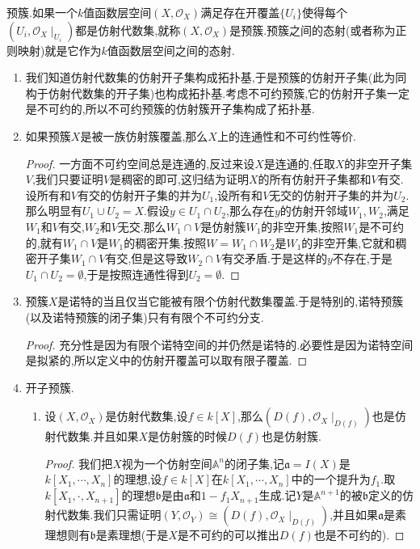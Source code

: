 预簇.如果一个$k$值函数层空间$(X,\mathscr{O}_X)$满足存在开覆盖$\{U_i\}$使得每个$(U_i,\mathscr{O}_X\mid_{U_i})$都是仿射代数集,就称$(X,\mathscr{O}_X)$是预簇.预簇之间的态射(或者称为正则映射)就是它作为$k$值函数层空间之间的态射.
\begin{enumerate}
	\item 我们知道仿射代数集的仿射开子集构成拓扑基,于是预簇的仿射开子集(此为同构于仿射代数集的开子集)也构成拓扑基.考虑不可约预簇,它的仿射开子集一定是不可约的,所以不可约预簇的仿射簇开子集构成了拓扑基.
	\item 如果预簇$X$是被一族仿射簇覆盖,那么$X$上的连通性和不可约性等价.
	\begin{proof}
		
		一方面不可约空间总是连通的,反过来设$X$是连通的,任取$X$的非空开子集$V$,我们只要证明$V$是稠密的即可,这归结为证明$X$的所有仿射开子集都和$V$有交.设所有和$V$有交的仿射开子集的并为$U_1$,设所有和$V$无交的仿射开子集的并为$U_2$.那么明显有$U_1\cup U_2=X$.假设$y\in U_1\cap U_2$,那么存在$y$的仿射开邻域$W_1,W_2$,满足$W_1$和$V$有交,$W_2$和$V$无交.那么$W_1\cap V$是仿射簇$W_1$的非空开集,按照$W_1$是不可约的,就有$W_1\cap V$是$W_1$的稠密开集.按照$W=W_1\cap W_2$是$W_1$的非空开集,它就和稠密开子集$W_1\cap V$有交,但是这导致$W_2\cap V$有交矛盾.于是这样的$y$不存在,于是$U_1\cap U_2=\emptyset$,于是按照连通性得到$U_2=\emptyset$.
	\end{proof}
    \item 预簇$X$是诺特的当且仅当它能被有限个仿射代数集覆盖.于是特别的,诺特预簇(以及诺特预簇的闭子集)只有有限个不可约分支.
    \begin{proof}
    	
    	充分性是因为有限个诺特空间的并仍然是诺特的.必要性是因为诺特空间是拟紧的,所以定义中的仿射开覆盖可以取有限子覆盖.
    \end{proof}
    \item 开子预簇.
    \begin{enumerate}
    	\item 设$(X,\mathscr{O}_X)$是仿射代数集,设$f\in k[X]$,那么$(D(f),\mathscr{O}_X\mid_{D(f)})$也是仿射代数集.并且如果$X$是仿射簇的时候$D(f)$也是仿射簇.
    	\begin{proof}
    		
    		我们把$X$视为一个仿射空间$\mathbb{A}^n$的闭子集,记$\mathfrak{a}=I(X)$是$k[X_1,\cdots,X_n]$的理想,设$f\in k[X]$在$k[X_1,\cdots,X_n]$中的一个提升为$f_1$.取$k[X_1,\cdot,X_{n+1}]$的理想$\mathfrak{b}$是由$\mathfrak{a}$和$1-f_1X_{n+1}$生成.记$Y$是$\mathbb{A}^{n+1}$的被$\mathfrak{b}$定义的仿射代数集.我们只需证明$(Y,\mathscr{O}_Y)\cong(D(f),\mathscr{O}_X\mid_{D(f)})$,并且如果$\mathfrak{a}$是素理想则有$\mathfrak{b}$是素理想(于是$X$是不可约的可以推出$D(f)$也是不可约的).
    		

\end{proof}
\end{enumerate}
\end{enumerate}
